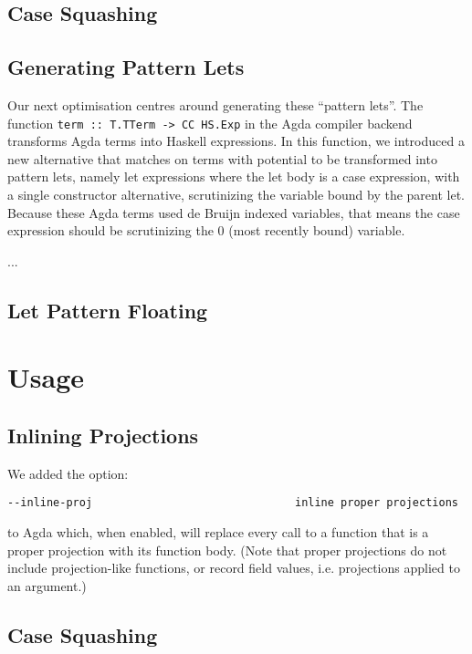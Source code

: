 \subsection{Case Squashing}

\subsection{Generating Pattern Lets}

Our next optimisation centres around generating these ``pattern lets''. The function \lstinline{term :: T.TTerm -> CC HS.Exp} in the Agda compiler backend transforms Agda terms into Haskell expressions. In this function, we introduced a new alternative that matches on terms with potential to be transformed into pattern lets, namely let expressions where the let body is a case expression, with a single constructor alternative, scrutinizing the variable bound by the parent let. Because these Agda terms used de Bruijn indexed variables, that means the case expression should be scrutinizing the 0 (most recently bound) variable.

...

\subsection{Let Pattern Floating}

\section{Usage}
\label{sec:usage}

\subsection{Inlining Projections}

We added the option:

\begin{verbatim}
--inline-proj                               inline proper projections
\end{verbatim}

to Agda which, when enabled, will replace every call to a function that is a proper projection with its function body. (Note that proper projections do not include projection-like functions, or record field values, i.e. projections applied to an argument.)

\subsection{Case Squashing}

